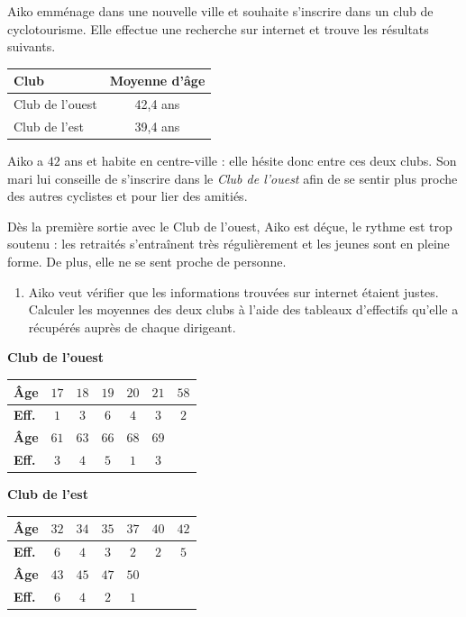\begin{exo}
	Aiko emménage dans une nouvelle ville et souhaite s'inscrire dans un club de cyclotourisme. Elle effectue une recherche sur internet et trouve les résultats suivants.
	\begin{center}
		\footnotesize
		\def\arraystretch{1.4}
		\begin{tabular}{|l|c|}
			\hline
			\textbf{Club}   & \textbf{Moyenne d'âge} \\ \hline
			Club de l'ouest & 42,4 ans               \\ \hline
			Club de l'est   & 39,4 ans               \\ \hline
		\end{tabular}
	\end{center}

	Aiko a $42$ ans et habite en centre-ville : elle hésite donc entre ces deux clubs. Son mari lui conseille de s'inscrire dans le \textit{Club de l'ouest} afin de se sentir plus proche des autres cyclistes et pour lier des amitiés.

	Dès la première sortie avec le Club de l'ouest, Aiko est déçue, le rythme est trop soutenu : les retraités s'entraînent très régulièrement et les jeunes sont en pleine forme. De plus, elle ne se sent proche de personne.

	\begin{enumerate}
		\item Aiko veut vérifier que les informations trouvées sur internet étaient justes. Calculer les moyennes des deux clubs à l'aide des tableaux d'effectifs qu'elle a récupérés auprès de chaque dirigeant.
	\end{enumerate}

	\begin{center}
		\def\arraystretch{1.4}
		\textbf{Club de l'ouest}\\[2mm]
		\begin{tabular}{|l|c|c|c|c|c|c|} \hline
			\textbf{Âge}  & $17$ & $18$ & $19$ & $20$ & $21$ & $58$ \\ \hline
			\textbf{Eff.} & $1$  & $3$  & $6$  & $4$  & $3$  & $2$  \\ \hline\hline
			\textbf{Âge}  & $61$ & $63$ & $66$ & $68$ & $69$ &      \\ \hline
			\textbf{Eff.} & $3$  & $4$  & $5$  & $1$  & $3$  &      \\ \hline
		\end{tabular}

		\bigskip

		\textbf{Club de l'est}\\[2mm]
		\begin{tabular}{|l|c|c|c|c|c|c|} \hline
			\textbf{Âge}  & $32$ & $34$ & $35$ & $37$ & $40$ & $42$ \\ \hline
			\textbf{Eff.} & $6$  & $4$  & $3$  & $2$  & $2$  & $5$  \\ \hline\hline
			\textbf{Âge}  & $43$ & $45$ & $47$ & $50$ &      &      \\ \hline
			\textbf{Eff.} & $6$  & $4$  & $2$  & $1$  &      &      \\ \hline
		\end{tabular}
	\end{center}


\end{exo}
